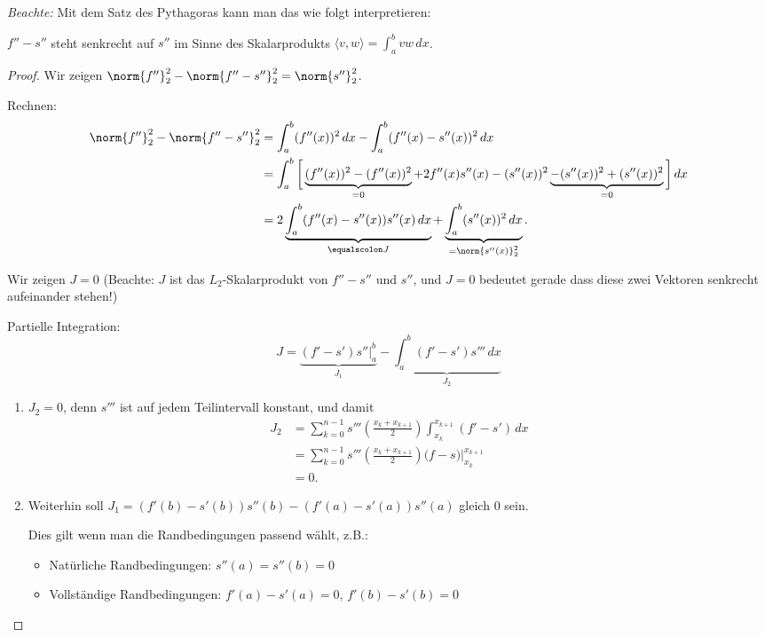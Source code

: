 \emph{Beachte:} Mit dem Satz des Pythagoras kann man das wie folgt interpretieren:\\

\medskip

   $f''- s''$ steht senkrecht auf $s''$ im Sinne des Skalarprodukts $\langle v,w\rangle = \int_{a}^bvw\,dx$.

\begin{proof}
Wir zeigen $\norm{f''}^2_2 - \norm{f'' - s''}_2^2 = \norm{s''}_2^2$.

\bigskip
Rechnen:
\begin{align*}
 \norm{f''}_2^2 - \norm{f'' - s''}_2^2
 &=
 \int_{a}^b(f''(x))^2\,dx - \int_{a}^b(f''(x) - s''(x))^2\,dx\\
 &=
 \int_{a}^b \bigg[ \underbrace{(f''(x))^2 - (f''(x))^2}_{= 0} + 2f''(x)s''(x) - (s''(x))^2 \underbrace{- (s''(x))^2 + (s''(x))^2}_{=0} \bigg] \,dx\\
 &=
 2\underbrace{\int_{a}^b(f''(x) - s''(x))s''(x)\,dx}_{\equalscolon J}
   + \underbrace{\int_{a}^b(s''(x))^2\,dx}_{= \norm{s''(x)}_2^2}.
\end{align*}

Wir zeigen $J=0$ (Beachte: $J$ ist das $L_2$-Skalarprodukt von $f''-s''$ und $s''$, und $J=0$
bedeutet gerade dass diese zwei Vektoren senkrecht aufeinander stehen!)

\bigskip

Partielle Integration:
\begin{equation*}
 J = \underbrace{(f'-s')s''\Big|_a^b}_{J_1} - \underbrace{\int_a^b (f'-s')s'''\,dx}_{J_2}
\end{equation*}

\begin{enumerate}
 \item $J_2 = 0$, denn $s'''$ ist auf jedem Teilintervall konstant, und damit
 \begin{align*}
  J_2
  & =
  \sum_{k=0}^{n-1}s'''\left(\frac{x_k+x_{k+1}}{2}\right)\int_{x_k}^{x_{k+1}}(f'-s')\,dx\\
  &=
  \sum_{k=0}^{n-1}s'''\left(\frac{x_k+x_{k+1}}{2}\right)\big(f - s\big)\Big|_{x_k}^{x_{k+1}}\\
  &=
  0.
 \end{align*}

 \item Weiterhin soll $J_1 = (f'(b)-s'(b))s''(b) - (f'(a)-s'(a))s''(a)$ gleich 0 sein.

 Dies gilt wenn man die Randbedingungen passend wählt, z.B.:
  \begin{itemize}
     \item Natürliche Randbedingungen: $s''(a) = s''(b) = 0$
     \item Vollständige Randbedingungen: $f'(a) - s'(a)=0$, $f'(b) - s'(b) =0$
     \qedhere
  \end{itemize}
\end{enumerate}
\end{proof}

